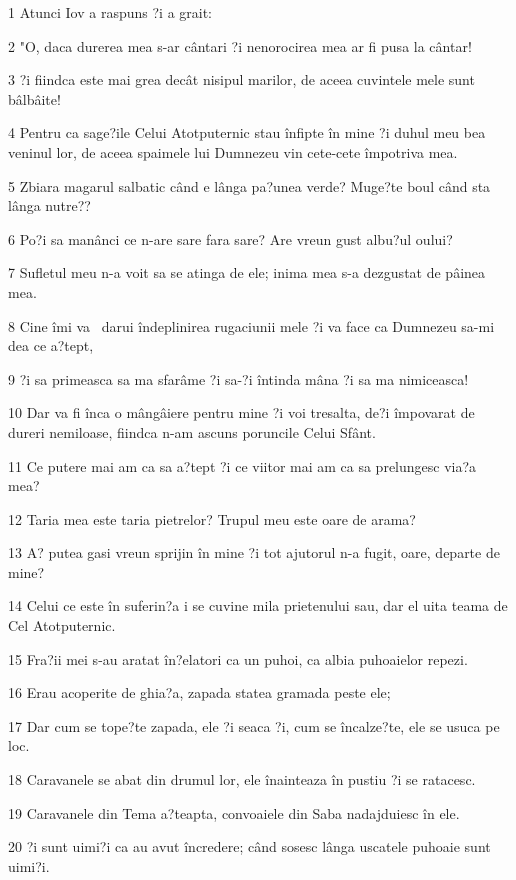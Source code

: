 \par 1 Atunci Iov a raspuns ?i a grait:
\par 2 "O, daca durerea mea s-ar cântari ?i nenorocirea mea ar fi pusa la cântar!
\par 3 ?i fiindca este mai grea decât nisipul marilor, de aceea cuvintele mele sunt bâlbâite!
\par 4 Pentru ca sage?ile Celui Atotputernic stau înfipte în mine ?i duhul meu bea veninul lor, de aceea spaimele lui Dumnezeu vin cete-cete împotriva mea.
\par 5 Zbiara magarul salbatic când e lânga pa?unea verde? Muge?te boul când sta lânga nutre??
\par 6 Po?i sa manânci ce n-are sare fara sare? Are vreun gust albu?ul oului?
\par 7 Sufletul meu n-a voit sa se atinga de ele; inima mea s-a dezgustat de pâinea mea.
\par 8 Cine îmi va  darui îndeplinirea rugaciunii mele ?i va face ca Dumnezeu sa-mi dea ce a?tept,
\par 9 ?i sa primeasca sa ma sfarâme ?i sa-?i întinda mâna ?i sa ma nimiceasca!
\par 10 Dar va fi înca o mângâiere pentru mine ?i voi tresalta, de?i împovarat de dureri nemiloase, fiindca n-am ascuns poruncile Celui Sfânt.
\par 11 Ce putere mai am ca sa a?tept ?i ce viitor mai am ca sa prelungesc via?a mea?
\par 12 Taria mea este taria pietrelor? Trupul meu este oare de arama?
\par 13 A? putea gasi vreun sprijin în mine ?i tot ajutorul n-a fugit, oare, departe de mine?
\par 14 Celui ce este în suferin?a i se cuvine mila prietenului sau, dar el uita teama de Cel Atotputernic.
\par 15 Fra?ii mei s-au aratat în?elatori ca un puhoi, ca albia puhoaielor repezi.
\par 16 Erau acoperite de ghia?a, zapada statea gramada peste ele;
\par 17 Dar cum se tope?te zapada, ele ?i seaca ?i, cum se încalze?te, ele se usuca pe loc.
\par 18 Caravanele se abat din drumul lor, ele înainteaza în pustiu ?i se ratacesc.
\par 19 Caravanele din Tema a?teapta, convoaiele din Saba nadajduiesc în ele.
\par 20 ?i sunt uimi?i ca au avut încredere; când sosesc lânga uscatele puhoaie sunt uimi?i.

